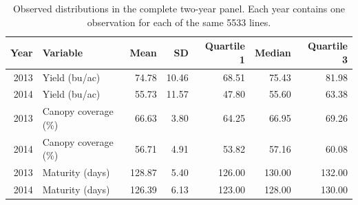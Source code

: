 \begin{table}[t]
\centering
\small
\caption{Observed distributions in the complete two-year panel. Each year contains one observation for each of the same 5533 lines.}
\label{tab:soy-descriptive}
\begin{tabular}{rlrrrrr}
\toprule
Year & Variable & Mean & SD & Quartile 1 & Median & Quartile 3 \\
\midrule
2013 & Yield (bu/ac) & 74.78 & 10.46 & 68.51 & 75.43 & 81.98 \\
2014 & Yield (bu/ac) & 55.73 & 11.57 & 47.80 & 55.60 & 63.38 \\
2013 & Canopy coverage (\%) & 66.63 & 3.80 & 64.25 & 66.95 & 69.26 \\
2014 & Canopy coverage (\%) & 56.71 & 4.91 & 53.82 & 57.16 & 60.08 \\
2013 & Maturity (days) & 128.87 & 5.40 & 126.00 & 130.00 & 132.00 \\
2014 & Maturity (days) & 126.39 & 6.13 & 123.00 & 128.00 & 130.00 \\
\bottomrule
\end{tabular}
\end{table}

